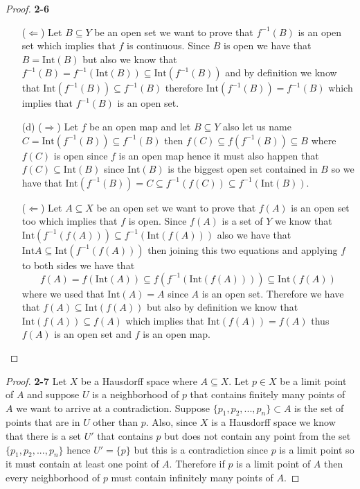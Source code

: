 \documentclass[11pt]{article}
\newcommand{\inter}{\text{Int}}
\theoremstyle{definition}
\begin{document}
\begin{proof}{\textbf{2-6}}
\begin{itemize}
    ($\Leftarrow$) Let $B \subseteq Y$ be an open set we want to prove that
    $f^{-1}(B)$ is an open set which implies that $f$ is continuous.
    Since $B$ is open we have that $B = \inter(B)$
    but also we know that $f^{-1}(B) = f^{-1}(\inter(B)) \subseteq \inter(f^{-1}(B))$
    and by definition we know that $\inter(f^{-1}(B)) \subseteq f^{-1}(B)$
    therefore $\inter(f^{-1}(B)) = f^{-1}(B)$ which implies that $f^{-1}(B)$
    is an open set.

    \item [(d)]
    ($\Rightarrow$) Let $f$ be an open map and let $B \subseteq Y$
    also let us name $C = \inter(f^{-1}(B)) \subseteq f^{-1}(B)$
    then $f(C)\subseteq f(f^{-1}(B)) \subseteq B$ where
    $f(C)$ is open since $f$ is an open map hence it must
    also happen that $f(C) \subseteq \inter(B)$ since $\inter(B)$ is the biggest
    open set contained in $B$ so we have that
    $\inter(f^{-1}(B)) = C \subseteq f^{-1}(f(C)) \subseteq f^{-1}(\inter(B))$.

    ($\Leftarrow$) Let $A \subseteq X$ be an open set we want to prove that
    $f(A)$ is an open set too which implies that $f$ is open.
    Since $f(A)$ is a set of $Y$ we know that
    $\inter (f^{-1}(f(A))) \subseteq f^{-1}(\inter(f(A)))$ also we have that
    $\inter A \subseteq \inter (f^{-1}(f(A)))$ then joining this two
    equations and applying $f$ to both sides we have that
    $$f(A) = f(\inter(A)) \subseteq f(f^{-1}(\inter(f(A)))) \subseteq \inter(f(A)) $$
    where we used that $\inter(A) = A$ since $A$ is an open set.
    Therefore we have that $f(A) \subseteq \inter(f(A))$ but also by definition
    we know that $\inter(f(A)) \subseteq f(A)$ which implies that
    $\inter(f(A)) = f(A)$ thus $f(A)$ is an open set and $f$ is an open map.
\end{itemize}
\end{proof}
\cleardoublepage
\begin{proof}{\textbf{2-7}}
    Let $X$ be a Hausdorff space where $A \subseteq X$.
    Let $p \in X$ be a limit point of $A$ and suppose $U$ is a neighborhood
    of $p$ that contains finitely many points of $A$ we want to arrive at a
    contradiction. Suppose $\{p_1, p_2,..., p_n\} \subset A$ is the set of
    points that are in $U$ other than $p$.
    Also, since $X$ is a Hausdorff space we know
    that there is a set $U'$ that contains $p$ but does not contain any point
    from the set $\{p_1, p_2,..., p_n\}$ hence $U' = \{p\}$
    but this is a contradiction since $p$ is a limit point so it must contain
    at least one point of $A$.
    Therefore if $p$ is a limit point of $A$ then every neighborhood of $p$
    must contain infinitely many points of $A$.
\end{proof}
\end{document}
